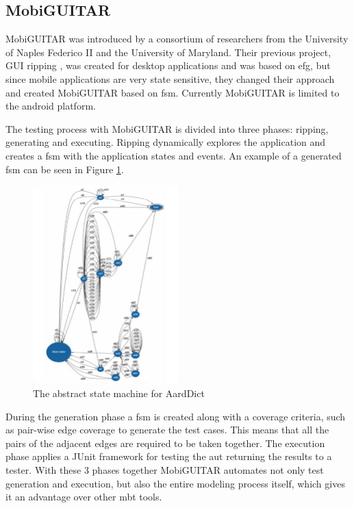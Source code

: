 \subsection{MobiGUITAR}
\par
MobiGUITAR was introduced by a consortium  of researchers from the University of Naples Federico II and the University of Maryland. Their previous project, GUI ripping \cite{GUIripping}, was created for desktop applications and was based on \acrshort{efg}, but since mobile applications are very state sensitive, they changed their approach and created MobiGUITAR based on \acrshort{fsm}. Currently MobiGUITAR is limited to the android platform.

\par
The testing process with MobiGUITAR is divided into three phases: ripping, generating and executing. Ripping dynamically explores the application and creates a \acrshort{fsm} with the application states and events. An example of a generated \acrshort{fsm} can be seen in Figure \ref{Fig:MobiGuitar}.

\begin{figure} [htbp!]
	\centering
					\includegraphics[width=0.5\textwidth]{figures/mobiguitar.JPG}
					\caption{\label{Fig:MobiGuitar} The abstract state machine for AardDict\cite{MobiGUITAR}}
\end{figure}

During the generation phase a \acrshort{fsm} is created along with a coverage criteria, such as pair-wise edge coverage to generate the test cases. This means that all the pairs of the adjacent edges are required to be taken together.
The execution phase applies a JUnit framework for testing the \acrshort{aut} returning the results to a tester. With these 3 phases together MobiGUITAR automates not only test generation and execution, but also the entire modeling process itself, which gives it an advantage over other \acrshort{mbt} tools.

